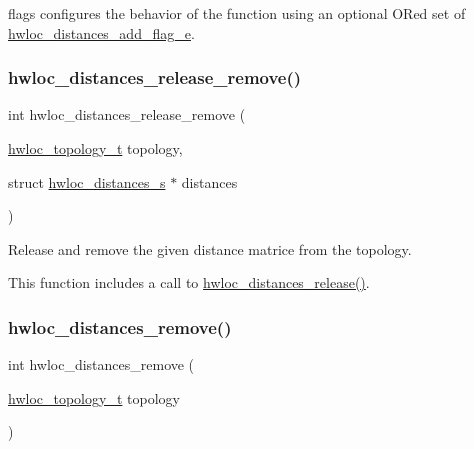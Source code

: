 {\ttfamily flags} configures the behavior of the function using an optional OR\textquotesingle{}ed set of \hyperlink{a00210_ga22428b6bab271411e3834e6b4ca22e37}{hwloc\+\_\+distances\+\_\+add\+\_\+flag\+\_\+e}. \mbox{\label{a00210_ga80bbf6f0db9af48c61780dd5152664c2}} 
\subsubsection{\texorpdfstring{hwloc\+\_\+distances\+\_\+release\+\_\+remove()}{hwloc\_distances\_release\_remove()}}
{\footnotesize\ttfamily int hwloc\+\_\+distances\+\_\+release\+\_\+remove (\begin{DoxyParamCaption}\item[{\hyperlink{a00186_ga9d1e76ee15a7dee158b786c30b6a6e38}{hwloc\+\_\+topology\+\_\+t}}]{topology,  }\item[{struct \hyperlink{a00310}{hwloc\+\_\+distances\+\_\+s} $\ast$}]{distances }\end{DoxyParamCaption})}



Release and remove the given distance matrice from the topology. 

This function includes a call to \hyperlink{a00208_ga1dd78c1f9acd54f26aba0e284e97e51d}{hwloc\+\_\+distances\+\_\+release()}. \mbox{\label{a00210_gac188d9b64d9560255ce5f6d0a20f9c0a}} 
\subsubsection{\texorpdfstring{hwloc\+\_\+distances\+\_\+remove()}{hwloc\_distances\_remove()}}
{\footnotesize\ttfamily int hwloc\+\_\+distances\+\_\+remove (\begin{DoxyParamCaption}\item[{\hyperlink{a00186_ga9d1e76ee15a7dee158b786c30b6a6e38}{hwloc\+\_\+topology\+\_\+t}}]{topology }\end{DoxyParamCaption})}



